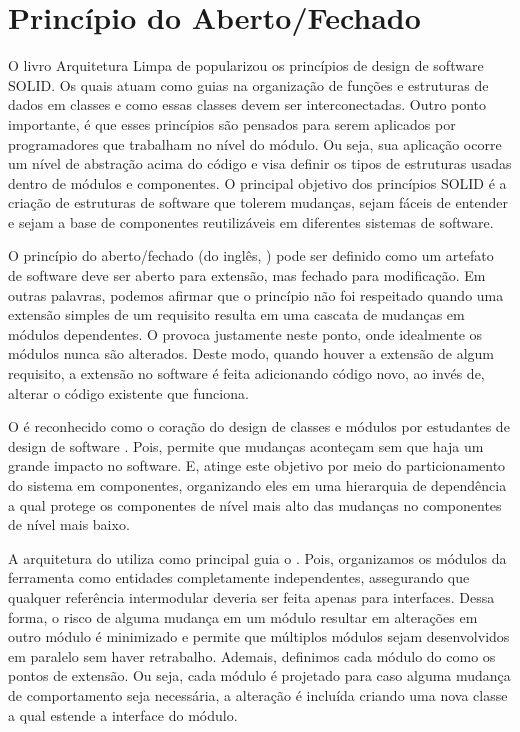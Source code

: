 \documentclass[12pt]{tcc}
\begin{document}
		\section{Princípio do Aberto/Fechado}
		\label{sec:solid-ocp}
		O livro Arquitetura Limpa de \citet{MartinCleanArchtecture2017} popularizou os princípios de design de software SOLID.
		Os quais atuam como guias na organização de funções e estruturas de dados em classes e como essas classes devem ser interconectadas.
		Outro ponto importante, é que esses princípios são pensados para serem aplicados por programadores que trabalham no nível do módulo.
		Ou seja, sua aplicação ocorre um nível de abstração acima do código e visa definir os tipos de estruturas usadas dentro de módulos e componentes.
		O principal objetivo dos princípios SOLID é a criação de estruturas de software que tolerem mudanças, sejam fáceis de entender e sejam a base de componentes reutilizáveis em diferentes sistemas de software.

		O princípio do aberto/fechado (do inglês, ) pode ser definido como um artefato de software deve ser aberto para extensão, mas fechado para modificação. \citep{Meyer1997ObjectOrientedSoftwareConstruction}
		Em outras palavras, podemos afirmar que o princípio não foi respeitado quando uma extensão simples de um requisito resulta em uma cascata de mudanças em módulos dependentes.
		O  provoca justamente neste ponto, onde idealmente os módulos nunca são alterados.
		Deste modo, quando houver a extensão de algum requisito, a extensão no software é feita adicionando código novo, ao invés de, alterar o código existente que funciona. \citep{Martin2000TheOP}

		O  é reconhecido como o coração do design de classes e módulos por estudantes de design de software \citep{MartinCleanArchtecture2017}.
		Pois, permite que mudanças aconteçam sem que haja um grande impacto no software.
		E, atinge este objetivo por meio do particionamento do sistema em componentes, organizando eles em uma hierarquia de dependência a qual protege os componentes de nível mais alto das mudanças no componentes de nível mais baixo. \citep{MartinCleanArchtecture2017}

		A arquitetura do  utiliza como principal guia o .
		Pois, organizamos os módulos da ferramenta como entidades completamente independentes, assegurando que qualquer referência intermodular deveria ser feita apenas para interfaces.
		Dessa forma, o risco de alguma mudança em um módulo resultar em alterações em outro módulo é minimizado e permite que múltiplos módulos sejam desenvolvidos em paralelo sem haver retrabalho.
		Ademais, definimos cada módulo do  como os pontos de extensão.
		Ou seja, cada módulo é projetado para caso alguma mudança de comportamento seja necessária, a alteração é incluída criando uma nova classe a qual estende a interface do módulo.
\end{document}
